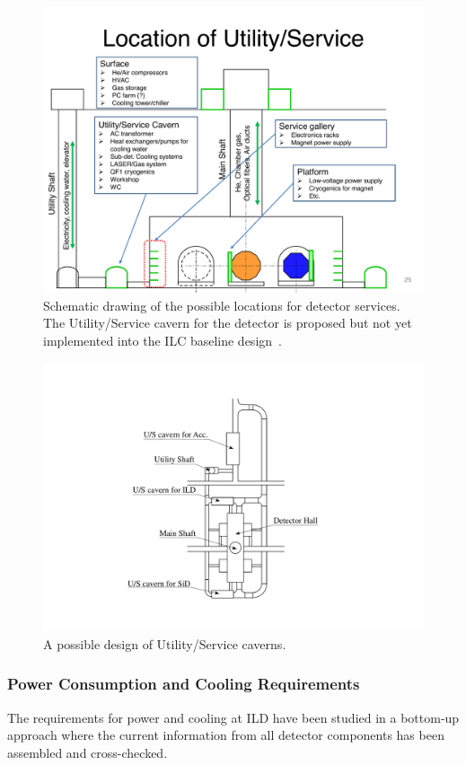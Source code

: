 \begin{figure}[h!]
\includegraphics[width=1.0\hsize]{Integration/fig/Services.pdf}
\caption{\label{fig:integration:services}Schematic drawing of the possible locations for detector services. The Utility/Service cavern for the detector is proposed but not yet implemented into the ILC baseline design~\cite{ild:bib:services}. }
\end{figure}

\begin{figure}[h!]
\centering
\includegraphics[width=0.5\hsize]{Integration/fig/USC.pdf}
\caption{\label{fig:integration:USC}A possible design of Utility/Service caverns. }
\end{figure}

\subsubsection{Power Consumption and Cooling Requirements}
\label{ild:sec:power}
The requirements for power and cooling at ILD have been studied in a bottom-up approach where the current information from all detector components has been assembled and cross-checked.

